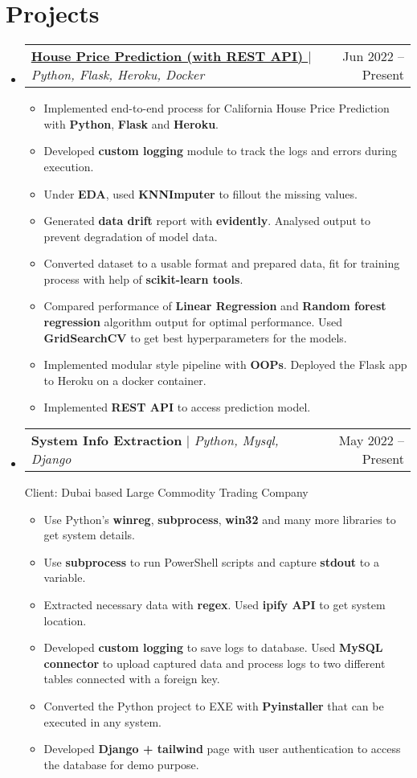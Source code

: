 \documentclass[letterpaper, 11pt]{article}
\makeatletter
\newcommand{\resumeItem}[1]{ \item\small{ {#1 \vspace{-2pt}} } }
\newcommand{\resumeProjectHeading}[2]{ \item
\begin{tabular*}{0.97\textwidth}{l@{\extracolsep{\fill}}r}
	\small#1 & #2 \\
\end{tabular*}
\vspace{-7pt}
}
\newcommand{\resumeSubHeadingListStart}{\begin{itemize}[leftmargin=0.15in, label={}]}
\newcommand{\resumeSubHeadingListEnd}{\end{itemize}}
\newcommand{\resumeItemListStart}{\begin{itemize}}
\newcommand{\resumeItemListEnd}{\end{itemize}
\vspace{-5pt}}
\makeatother
\begin{document}
	\section{Projects}
	\resumeSubHeadingListStart \resumeProjectHeading
	{\textbf{\href{https://github.com/bheemaguli/House-Price-Prediction}{House Price Prediction (with REST API) {\tiny \textcolor{blue}{\faLink}}}} $|$ \emph{Python, Flask, Heroku, Docker}}{Jun 2022 -- Present}
	\resumeItemListStart \resumeItem{Implemented end-to-end process for California House Price Prediction with {\textbf{Python}}, {\textbf{Flask}} and {\textbf{Heroku}}.}
	\resumeItem{Developed {\textbf{custom logging}} module to track the logs and errors during execution.}
	\resumeItem{Under {\textbf{EDA}}, used {\textbf{KNNImputer}} to fillout the missing values.}
	\resumeItem{Generated {\textbf{data drift}} report with {\textbf{evidently}}. Analysed output to prevent degradation of model data.}
	\resumeItem{Converted dataset to a usable format and prepared data, fit for training process with help of {\textbf{scikit-learn tools}}.}
	\resumeItem{Compared performance of {\textbf{Linear Regression}} and {\textbf{Random forest regression}} algorithm output for optimal performance. Used {\textbf{GridSearchCV}} to get best hyperparameters for the models.}
	\resumeItem{Implemented modular style pipeline with {\textbf{OOPs}}. Deployed the Flask app to Heroku on a docker container.}
	\resumeItem{Implemented {\textbf{REST API}} to access prediction model.} \resumeItemListEnd
	\resumeProjectHeading {\textbf{System Info Extraction} $|$ \emph{Python, Mysql, Django}}{May 2022 -- Present}
	\hspace{10px}
	\vspace{-2px}
	Client: Dubai based Large Commodity Trading Company \resumeItemListStart
	\vspace{4pt}
	\resumeItem{Use Python's {\textbf{winreg}}, {\textbf{subprocess}}, {\textbf{win32}} and many more libraries to get system details.}
	\resumeItem{Use {\textbf{subprocess}} to run PowerShell scripts and capture {\textbf{stdout}} to a variable.}
	\resumeItem{Extracted necessary data with {\textbf{regex}}. Used {\textbf{ipify API}} to get system location.}
	\resumeItem{Developed {\textbf{custom logging}} to save logs to database. Used {\textbf{MySQL connector}} to upload captured data and process logs to two different tables connected with a foreign key.}
	\resumeItem{Converted the Python project to EXE with {\textbf{Pyinstaller}} that can be executed in any system.}
	\resumeItem{Developed {\textbf{Django + tailwind}} page with user authentication to access the database for demo purpose.}
	\resumeItemListEnd \resumeSubHeadingListEnd
\end{document}
